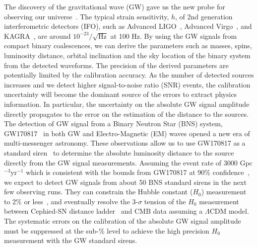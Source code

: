 \documentclass[%
 reprint,
superscriptaddress,
 amsmath,amssymb,
 aps,
]{revtex4-1}
\begin{document}
The discovery of the gravitational wave (GW) gave us the new probe for observing our universe~\cite{PhysRevLett.116.061102}. 
The typical strain sensitivity, $h$, of 2nd generation interferometric detectors (IFO), such as Advanced LIGO~\cite{0264-9381-32-7-074001}, Advanced Virgo~\cite{0264-9381-32-2-024001}, and KAGRA~\cite{0264-9381-29-12-124007, PhysRevD.88.043007}, are around $10^{-23}/\sqrt{\mathrm{Hz}}$ at 100 Hz. 
By using the GW signals from compact binary coalescences, we can derive 
the parameters such as masses, spins, luminosity distance, orbital inclination 
and the sky location of the binary system from the detected waveforms. 
The precision of the derived parameters are potentially limited by the 
calibration accuracy. As the number of detected sources increases and we 
detect higher signal-to-noise ratio (SNR) events, the calibration uncertainty 
will become the dominant source of the errors to extract physics information. 
In particular, the uncertainty on the absolute GW signal amplitude directly 
propagates to the error on the estimation of the distance to the sources. 
The detection of GW signal from a Binary Neutron Star (BNS) system, 
GW170817~\cite{GW170817:2017aa} in both GW and Electro-Magnetic (EM) 
waves opened a new era of multi-messenger astronomy. These observations 
allow us to use GW170817 as a standard 
siren~\cite{Abbott:2017xzu,Schutz_1986,Holz_2005,Nissanke_2010} to 
determine the absolute luminosity distance to the source directly from the 
GW signal measurements. Assuming the event rate of 3000 Gpc$^{-3}$yr$^{-1}$ 
which is consistent with the bounds from GW170817 at 90\% 
confidence~\cite{GW170817:2017aa}, we expect to detect GW signals from about 
50 BNS standard sirens in the next few observing runs. 
They can constrain the Hubble constant ($H_0$) 
measurement to 2\% or less~\cite{Feeney:2018mkj}, and eventually resolve 
the 3-$\sigma$ tension of the $H_0$ measurement between Cephied-SN distance 
ladder~\cite{Riess_2016} and CMB data assuming a $\Lambda$CDM 
model.~\cite{2016-planck} The systematic errors on the calibration of 
the absolute GW signal amplitude must be suppressed at the sub-\% level to 
achieve the high precision $H_0$ measurement with the GW standard sirens.

\end{document}
